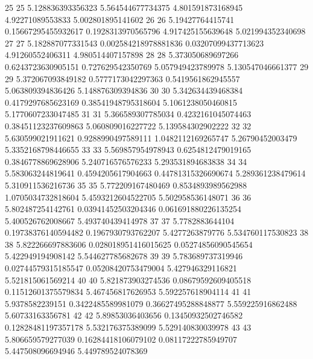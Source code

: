 {25 25 5.128836393356323 5.564544677734375 4.801591873168945 4.92271089553833 5.002801895141602
26 26 5.19427764415741 0.15667295455932617 0.1928313970565796 4.917425155639648 5.021994352340698
27 27 5.182887077331543 0.002584218978881836 0.03207099437713623 4.91260552406311 4.980514407157898
28 28 5.373050689697266 0.6243723630905151 0.727629542350769 5.057949423789978 5.130547046661377
29 29 5.372067093849182 0.5777173042297363 0.5419561862945557 5.063809394836426 5.148876309394836
30 30 5.342634439468384 0.4179297685623169 0.38541948795318604 5.1061238050460815 5.1770607233047485
31 31 5.366589307785034 0.4232161045074463 0.38451123237609863 5.060809016227722 5.139584302902222
32 32 5.630599021911621 0.9288990497589111 1.0482112169265747 5.26790452003479 5.3352168798446655
33 33 5.569857954978943 0.6254812479019165 0.3846778869628906 5.240716576576233 5.293531894683838
34 34 5.583063244819641 0.4594205617904663 0.44781315326690674 5.289361238479614 5.310911536216736
35 35 5.772209167480469 0.8534893989562988 1.0705034732818604 5.4593212604522705 5.502958536148071
36 36 5.802487254142761 0.03941452503204346 0.061691880226135254 5.400526762008667 5.493740439414978
37 37 5.7782883644104 0.19738376140594482 0.1967930793762207 5.4277263879776 5.534760117530823
38 38 5.822266697883606 0.028018951416015625 0.05274856090545654 5.422949194908142 5.544627785682678
39 39 5.783689737319946 0.02744579315185547 0.05208420753479004 5.427946329116821 5.521815061569214
40 40 5.821873903274536 0.08679592609405518 0.11512601375579834 5.467456817626953 5.592257618904114
41 41 5.9378582239151 0.3422485589981079 0.36627495288848877 5.559225916862488 5.60733163356781
42 42 5.89853036403656 0.13450932502746582 0.12828481197357178 5.532176375389099 5.529140830039978
43 43 5.806659579277039 0.16284418106079102 0.08117222785949707 5.447508096694946 5.449789524078369
}\tableexpiploadskltweet
